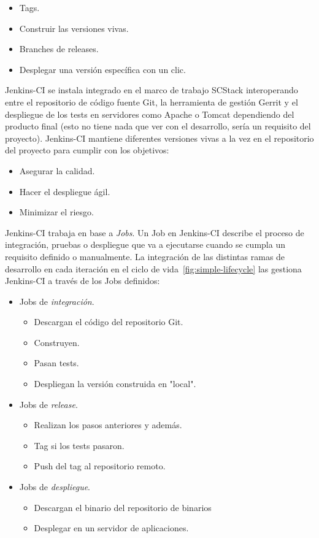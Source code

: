 \begin{itemize}
	\item Tags.
	\item Construir las versiones vivas.
	\item Branches de releases.
	\item Desplegar una versión específica con un clic.
\end{itemize}

\par Jenkins-CI se instala integrado en el marco de trabajo SCStack interoperando entre el repositorio de código fuente Git, la herramienta de gestión Gerrit y el despliegue de los tests en servidores como Apache o Tomcat dependiendo del producto final (esto no tiene nada que ver con el desarrollo, sería un requisito del proyecto). Jenkins-CI mantiene diferentes versiones vivas a la vez en el repositorio del proyecto para cumplir con los objetivos:

\begin{itemize}
	\item Asegurar la calidad.
	\item Hacer el despliegue ágil.
	\item Minimizar el riesgo.
\end{itemize}

\par Jenkins-CI trabaja en base a \emph{Jobs}. Un Job en Jenkins-CI describe el proceso de integración, pruebas o despliegue que va a ejecutarse cuando se cumpla un requisito definido o manualmente. La integración de las distintas ramas de desarrollo en cada iteración en el ciclo de vida~\ref{fig:simple-lifecycle} las gestiona Jenkins-CI a través de los Jobs definidos:

\begin{itemize}
	\item Jobs de \emph{integración}.
	    \begin{itemize}
        	\item Descargan el código del repositorio Git.
        	\item Construyen.
        	\item Pasan tests.
        	\item Despliegan la versión construida en "local".
        \end{itemize}
	\item Jobs de \emph{release}.
	    \begin{itemize}
        	\item Realizan los pasos anteriores y además.
        	\item Tag si los tests pasaron.
        	\item Push del tag al repositorio remoto.
        \end{itemize}
	\item Jobs de \emph{despliegue}.
	    \begin{itemize}
        	\item Descargan el binario del repositorio de binarios
        	\item Desplegar en un servidor de aplicaciones.
        \end{itemize}
\end{itemize}

